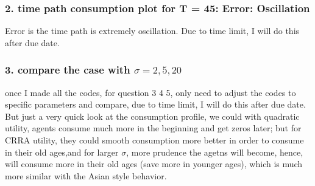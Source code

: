 \documentclass{article}[a4paper]
\begin{document}
\medskip

\subsubsection{2. time path consumption plot for T = 45: Error: Oscillation}
Error is the  time path is extremely oscillation. Due to time limit, I will do this after due date.


\subsubsection{3. compare the case with $\sigma=2,5,20$}

once I made all the codes, for question 3 4 5, only  need to adjust the codes to specific parameters and compare, due to time limit, I will do this after due date. But just a very quick look at the consumption profile, we could with quadratic utility, agents consume much more in the beginning and get zeros later; but for CRRA utility, they could smooth consumption more better in order to consume in their old ages,and for larger $\sigma$, more prudence the agetns will become, hence, will consume more in their old ages (save more in younger ages), which is much more similar with the Asian style behavior. 
\end{document}
